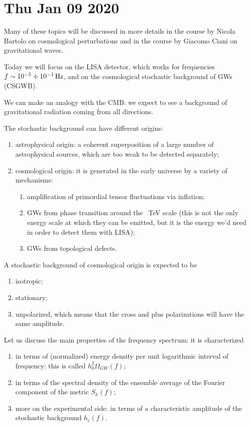 \documentclass[main.tex]{subfiles}
\begin{document}
\section*{Thu Jan 09 2020}

Many of these topics will be discussed in more details in the course by Nicola Bartolo on cosmological perturbations and in the course by Giacomo Ciani on gravitational waves. 

Today we will focus on the LISA detector, which works for frequencies \(f \sim \num{e-5} \divisionsymbol \SI{e-1}{Hz}\), and on the cosmological stochastic background of GWs (CSGWB). 

We can make an analogy with the CMB: we expect to see a background of gravitational radiation coming from all directions. 

The stochastic background can have different origins: 
\begin{enumerate}
  \item astrophysical origin: a coherent superposition of a large number of astrophysical sources, which are too weak to be detected separately;
  \item cosmological origin: it is generated in the early universe by a variety of mechanisms: 
  \begin{enumerate}
    \item amplification of primordial tensor fluctuations via inflation; 
    \item GWs from phase transition around the \SI{}{TeV} scale (this is not the only energy scale at which they can be emitted, but it is the energy we'd need in order to detect them with LISA);
    \item GWs from topological defects.
  \end{enumerate}
\end{enumerate}

A stochastic background of cosmological origin is expected to be 
\begin{enumerate}
  \item isotropic;
  \item stationary;
  \item unpolarized, which means that the cross and plus polarizations will have the same amplitude. 
\end{enumerate}

Let us discuss the main properties of the frequency spectrum: it is characterized 
\begin{enumerate}
  \item in terms of (normalized) energy density per unit logarithmic interval of frequency: this is called \(h_0^2 \Omega_{GW} (f)\);
  \item in terms of the spectral density of the ensemble average of the Fourier component of the metric \(S_{h}(f)\);
  \item more on the experimental side: in terms of a characteristic amplitude of the stochastic background \(h_{c} (f)\).
\end{enumerate}
\end{document}
